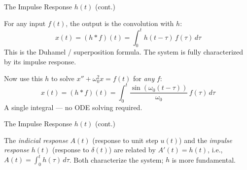 \documentclass[aspectratio=169,11pt]{beamer}
\begin{document}
\begin{frame}{The Impulse Response $h(t)$ (cont.)}
\footnotesize
\begin{methodbox}
For any input $f(t)$, the output is the convolution with $h$:
\[x(t) = (h * f)(t) = \int_0^t h(t-\tau)\, f(\tau)\, d\tau\]
This is the Duhamel / superposition formula. The system is fully characterized by its impulse response.
\end{methodbox}
\vspace{0.5mm}
\begin{examplebox}
Now use this $h$ to solve $x'' + \omega_0^2 x = f(t)$ for \emph{any} $f$:
\[x(t) = (h * f)(t) = \int_0^t \frac{\sin(\omega_0(t-\tau))}{\omega_0}\, f(\tau)\, d\tau\]
A single integral --- no ODE solving required.
\end{examplebox}
\end{frame}

\begin{frame}{The Impulse Response $h(t)$ (cont.)}
\footnotesize
\begin{conceptbox}
The \emph{indicial response} $A(t)$ (response to unit step $u(t)$) and the \emph{impulse response} $h(t)$ (response to $\delta(t)$) are related by $A'(t) = h(t)$, i.e., $A(t) = \int_0^t h(\tau)\,d\tau$. Both characterize the system; $h$ is more fundamental.
\end{conceptbox}
\end{frame}
\end{document}
